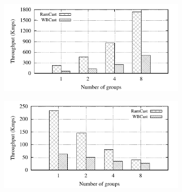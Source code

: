 \begin{figure}[ht]
  \begin{subfigure}{\columnwidth}
    \advance\leftskip-0.25cm
    \includegraphics[width=1.01\columnwidth]{figures/benchmark/graphs/figure-genuine-compare-throughput}
  \end{subfigure}
  \begin{subfigure}{\columnwidth}
    \advance\leftskip-0.1cm
    \includegraphics[width=0.99\columnwidth]{figures/benchmark/graphs/figure-multi-dest-compare-throughput}
  \end{subfigure}


\end{figure}
